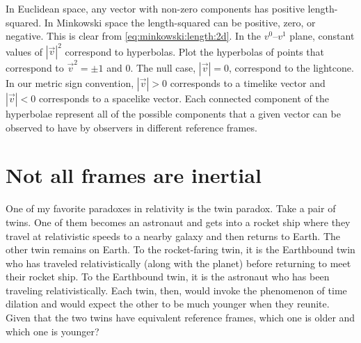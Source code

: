 \begin{exercise}
In Euclidean space, any vector with non-zero components has positive length-squared. In Minkowski space the length-squared can be positive, zero, or negative. This is clear from \eqref{eq:minkowski:length:2d}. In the $v^0$--$v^1$ plane, constant values of $|\vec{v}|^2$ correspond to hyperbolas. Plot the hyperbolas of points that correspond to $\vec{v}^2 = \pm 1$ and $0$. The null case, $|\vec{v}|=0$, correspond to the lightcone. In our metric sign convention, $|\vec{v}|>0$ corresponds to a timelike vector and $|\vec{v}|<0$ corresponds to a spacelike vector. Each connected component of the hyperbolae represent all of the possible components that a given vector can be observed to have by observers in different reference frames.
\end{exercise}


\section{Not all frames are inertial}

One of my favorite paradoxes in relativity is the twin paradox. Take a pair of twins. One of them becomes an astronaut and gets into a rocket ship where they travel at relativistic speeds to a nearby galaxy and then returns to Earth. The other twin remains on Earth. To the rocket-faring twin, it is the Earthbound twin who has traveled relativistically (along with the planet) before returning to meet their rocket ship. To the Earthbound twin, it is the astronaut who has been traveling relativistically. Each twin, then, would invoke the phenomenon of time dilation and would expect the other to be much younger when they reunite. Given that the two twins have equivalent reference frames, which one is older and which one is younger? 

